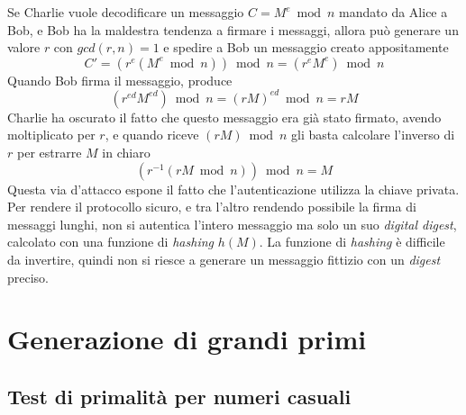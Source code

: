 Se Charlie vuole decodificare un messaggio $
C = M^e \bmod n 
$ mandato da Alice a Bob, e Bob ha la maldestra tendenza a firmare i messaggi,
allora può generare un valore $r$ con $
gcd(r,n) = 1
$ e spedire a Bob un messaggio creato appositamente
\begin{equation*}
    C' = \left( 
        r^e \left( 
            M^e \bmod n 
        \right)
    \right) \bmod n 
    =
    \left( 
        r^e M^e
    \right) \bmod n 
\end{equation*}
Quando Bob firma il messaggio, produce
\begin{equation*}
    \left( 
        r^{ed} M^{ed}
    \right) \bmod n 
    =
    \left( 
        rM
    \right)^{ed} \bmod n 
    = rM
\end{equation*}
Charlie ha oscurato il fatto che questo messaggio era già stato firmato, avendo moltiplicato per $r$, e quando riceve $
\left( rM \right) \bmod n 
$ gli basta calcolare l'inverso di $r$ per estrarre $M$ in chiaro
\begin{equation*}
    \left( r^{-1} \left( 
            rM \bmod n 
        \right)
    \right) \bmod n = M
\end{equation*}
Questa via d'attacco espone il fatto che l'autenticazione utilizza la chiave privata. Per rendere il protocollo sicuro, e tra l'altro rendendo possibile la firma di messaggi lunghi, non si autentica l'intero messaggio ma solo un suo \emph{digital digest}, calcolato con una funzione di \emph{hashing} $h(M)$.
La funzione di \emph{hashing} è difficile da invertire, quindi non si riesce a generare un messaggio fittizio con un \emph{digest} preciso.

\section{Generazione di grandi primi}

\subsection{Test di primalità per numeri casuali}


